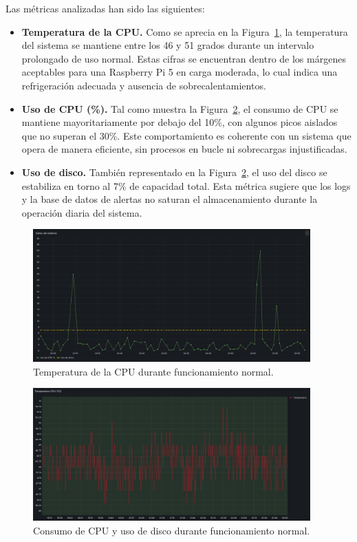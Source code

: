 \documentclass[11pt,a4paper,twoside]{report}
\begin{document}
Las métricas analizadas han sido las siguientes:

\begin{itemize}
	\item \textbf{Temperatura de la CPU.} Como se aprecia en la Figura~\ref{fig:temp-normal}, la temperatura del sistema se mantiene entre los 46 y 51 grados durante un intervalo prolongado de uso normal. Estas cifras se encuentran dentro de los márgenes aceptables para una Raspberry Pi 5 en carga moderada, lo cual indica una refrigeración adecuada y ausencia de sobrecalentamientos.
	
	\item \textbf{Uso de CPU (\%).} Tal como muestra la Figura~\ref{fig:cpu-normal}, el consumo de CPU se mantiene mayoritariamente por debajo del 10\%, con algunos picos aislados que no superan el 30\%. Este comportamiento es coherente con un sistema que opera de manera eficiente, sin procesos en bucle ni sobrecargas injustificadas.
	
	\item \textbf{Uso de disco.} También representado en la Figura~\ref{fig:cpu-normal}, el uso del disco se estabiliza en torno al 7\% de capacidad total. Esta métrica sugiere que los logs y la base de datos de alertas no saturan el almacenamiento durante la operación diaria del sistema.
\end{itemize}

\begin{figure}[H]
	\centering
	\includegraphics[width=0.95\textwidth]{benchmark/1.png}
	\caption{Temperatura de la CPU durante funcionamiento normal.}
	\label{fig:temp-normal}
\end{figure}

\begin{figure}[H]
	\centering
	\includegraphics[width=0.95\textwidth]{benchmark/2.png}
	\caption{Consumo de CPU y uso de disco durante funcionamiento normal.}
	\label{fig:cpu-normal}
\end{figure}
\end{document}
